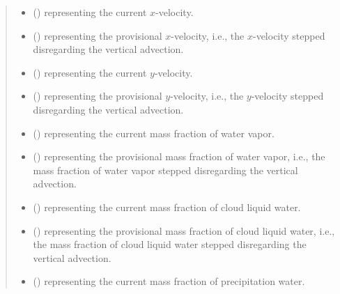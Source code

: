 \documentclass[letterpaper,10pt,english]{sphinxmanual}
\begin{document}
\begin{fulllineitems}
\begin{fulllineitems}
\begin{quote}
\begin{description}
\begin{itemize}
\item {} 
 () \textendash{}  representing the current \(x\)-velocity.

\item {} 
 () \textendash{}  representing the provisional \(x\)-velocity, i.e.,
the \(x\)-velocity stepped disregarding the vertical advection.

\item {} 
 () \textendash{}  representing the current \(y\)-velocity.

\item {} 
 () \textendash{}  representing the provisional \(y\)-velocity, i.e.,
the \(y\)-velocity stepped disregarding the vertical advection.

\item {} 
 () \textendash{}  representing the current mass fraction of water vapor.

\item {} 
 () \textendash{}  representing the provisional mass fraction of water vapor,
i.e., the mass fraction of water vapor stepped disregarding the vertical advection.

\item {} 
 () \textendash{}  representing the current mass fraction of cloud liquid water.

\item {} 
 () \textendash{}  representing the provisional mass fraction of cloud liquid water,
i.e., the mass fraction of cloud liquid water stepped disregarding the vertical advection.

\item {} 
 () \textendash{}  representing the current mass fraction of precipitation water.


\end{itemize}
\end{description}
\end{quote}
\end{fulllineitems}
\end{fulllineitems}
\end{document}
